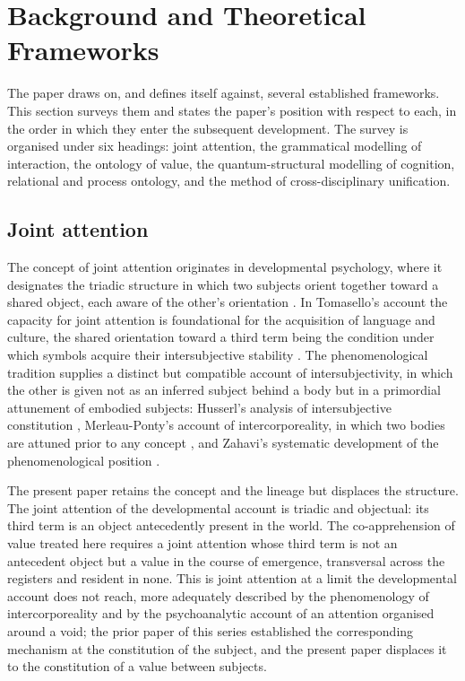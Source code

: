 \section{Background and Theoretical Frameworks}
\label{p10:sec:background}

\noindent
The paper draws on, and defines itself against, several established frameworks. This section surveys them and states the paper's position with respect to each, in the order in which they enter the subsequent development. The survey is organised under six headings: joint attention, the grammatical modelling of interaction, the ontology of value, the quantum-structural modelling of cognition, relational and process ontology, and the method of cross-disciplinary unification.

\subsection{Joint attention}
\label{p10:sec:bg-joint}

The concept of joint attention originates in developmental psychology, where it designates the triadic structure in which two subjects orient together toward a shared object, each aware of the other's orientation \parencite{tomasello1999,trevarthen1979}. In Tomasello's account the capacity for joint attention is foundational for the acquisition of language and culture, the shared orientation toward a third term being the condition under which symbols acquire their intersubjective stability \parencite{tomasello1999}. The phenomenological tradition supplies a distinct but compatible account of intersubjectivity, in which the other is given not as an inferred subject behind a body but in a primordial attunement of embodied subjects: Husserl's analysis of intersubjective constitution \parencite{husserl1960}, Merleau-Ponty's account of intercorporeality, in which two bodies are attuned prior to any concept \parencite{merleau2012}, and Zahavi's systematic development of the phenomenological position \parencite{zahavi1975}.

The present paper retains the concept and the lineage but displaces the structure. The joint attention of the developmental account is triadic and objectual: its third term is an object antecedently present in the world. The co-apprehension of value treated here requires a joint attention whose third term is not an antecedent object but a value in the course of emergence, transversal across the registers and resident in none. This is joint attention at a limit the developmental account does not reach, more adequately described by the phenomenology of intercorporeality and by the psychoanalytic account of an attention organised around a void; the prior paper of this series established the corresponding mechanism at the constitution of the subject, and the present paper displaces it to the constitution of a value between subjects.

